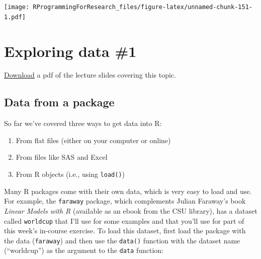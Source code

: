 \documentclass[]{book}
\makeatletter
\newenvironment{Shaded}{\begin{snugshade}}{\end{snugshade}}
\newcommand{\KeywordTok}[1]{\textcolor[rgb]{0.13,0.29,0.53}{\textbf{#1}}}
\newcommand{\DataTypeTok}[1]{\textcolor[rgb]{0.13,0.29,0.53}{#1}}
\newcommand{\StringTok}[1]{\textcolor[rgb]{0.31,0.60,0.02}{#1}}
\newcommand{\OperatorTok}[1]{\textcolor[rgb]{0.81,0.36,0.00}{\textbf{#1}}}
\newcommand{\NormalTok}[1]{#1}
\providecommand{\tightlist}{%
  \setlength{\itemsep}{0pt}\setlength{\parskip}{0pt}}
\newenvironment{kframe}{%
\medskip{}
\setlength{\fboxsep}{.8em}
 \def\at@end@of@kframe{}%
 \ifinner\ifhmode%
  \def\at@end@of@kframe{\end{minipage}}%
  \begin{minipage}{\columnwidth}%
 \fi\fi%
 \def\FrameCommand##1{\hskip\@totalleftmargin \hskip-\fboxsep
 \colorbox{shadecolor}{##1}\hskip-\fboxsep
     \hskip-\linewidth \hskip-\@totalleftmargin \hskip\columnwidth}%
 \MakeFramed {\advance\hsize-\width
   \@totalleftmargin\z@ \linewidth\hsize
   \@setminipage}}%
 {\par\unskip\endMakeFramed%
 \at@end@of@kframe}
\renewenvironment{Shaded}{\begin{kframe}}{\end{kframe}}
\theoremstyle{definition}
\theoremstyle{definition}
\theoremstyle{definition}
\theoremstyle{remark}
\makeatother
\begin{document}
\begin{Shaded}
\end{Shaded}

\texttt{[image: RProgrammingForResearch\_files/figure-latex/unnamed-chunk-151-1.pdf]}

\chapter{Exploring data \#1}\label{exploring-data-1}

\href{https://github.com/geanders/RProgrammingForResearch/raw/master/slides/CourseNotes_Week3.pdf}{Download}
a pdf of the lecture slides covering this topic.

\section{Data from a package}\label{data-from-a-package}

So far we've covered three ways to get data into R:

\begin{enumerate}
\def\labelenumi{\arabic{enumi}.}
\tightlist
\item
  From flat files (either on your computer or online)
\item
  From files like SAS and Excel
\item
  From R objects (i.e., using \texttt{load()})
\end{enumerate}

Many R packages come with their own data, which is very easy to load and
use. For example, the \texttt{faraway} package, which complements Julian
Faraway's book \emph{Linear Models with R} (available as an ebook from
the CSU library), has a dataset called \texttt{worldcup} that I'll use
for some examples and that you'll use for part of this week's in-course
exercise. To load this dataset, first load the package with the data
(\texttt{faraway}) and then use the \texttt{data()} function with the
dataset name (``worldcup'') as the argument to the \texttt{data}
function:
\end{document}
